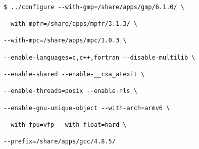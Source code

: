 \documentclass[]{article}
\begin{document}
                                                                                                                                                                                             \begin{lstlisting}
                                                                                                                                                                                             $ ../configure --with-gmp=/share/apps/gmp/6.1.0/ \
                                                                                                                                                                                                                       --with-mpfr=/share/apps/mpfr/3.1.3/ \
                                                                                                                                                                                                                       --with-mpc=/share/apps/mpc/1.0.3 \
                                                                                                                                                                                                                       --enable-languages=c,c++,fortran --disable-multilib \
                                                                                                                                                                                                                       --enable-shared --enable-__cxa_atexit \
                                                                                                                                                                                                                       --enable-threads=posix --enable-nls \
                                                                                                                                                                                                                       --enable-gnu-unique-object --with-arch=armv6 \
                                                                                                                                                                                                                       --with-fpu=vfp --with-float=hard \
                                                                                                                                                                                                                       --prefix=/share/apps/gcc/4.8.5/
                                                                                                                                                                                                                       \end{lstlisting}
\end{document}
